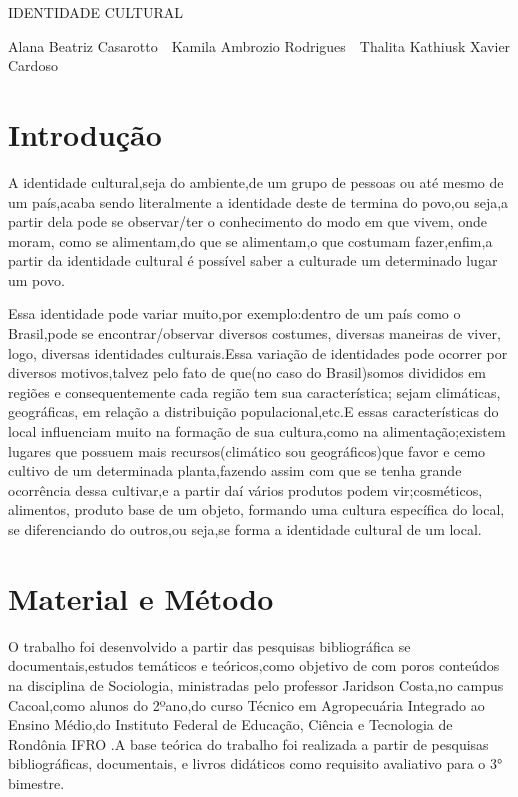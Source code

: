 \documentclass[article,12pt,onesidea,4paper,english,brazil]{abntex2}
\begin{document}
	
	
	\frenchspacing 
	
	\begin{center}
		\LARGE IDENTIDADE CULTURAL
		
		\normalsize
		Alana Beatriz Casarotto \,\,
	Kamila Ambrozio Rodrigues \,\,
		Thalita Kathiusk Xavier Cardoso 
	
	\end{center}
	


	
	\section*{Introdução}
	

A identidade cultural,seja do ambiente,de um grupo de pessoas ou até mesmo de um país,acaba sendo literalmente a identidade deste de termina do povo,ou seja,a partir dela pode se observar/ter o conhecimento do modo em que vivem, onde moram, como se alimentam,do que se alimentam,o que costumam fazer,enfim,a partir da identidade cultural é possível saber a culturade um determinado lugar um povo.

Essa identidade pode variar muito,por exemplo:dentro de um país como o Brasil,pode se encontrar/observar diversos costumes, diversas maneiras de viver, logo, diversas identidades culturais.Essa variação de identidades pode ocorrer por diversos motivos,talvez pelo fato de que(no caso do Brasil)somos divididos em regiões e consequentemente cada região tem sua característica; sejam climáticas, geográficas, em relação a distribuição populacional,etc.E essas características do local influenciam muito na formação de sua cultura,como na alimentação;existem lugares que possuem mais recursos(climático sou geográficos)que favor e cemo cultivo de um determinada planta,fazendo assim com que se tenha grande ocorrência dessa cultivar,e a partir daí vários produtos podem vir;cosméticos, alimentos, produto base de um objeto, formando uma cultura específica do local, se diferenciando do outros,ou seja,se forma a identidade cultural de um local.
	
	\section*{Material e Método}
	
O trabalho foi desenvolvido a partir das pesquisas bibliográfica se documentais,estudos temáticos e teóricos,como objetivo de com poros conteúdos na disciplina de Sociologia, ministradas pelo professor Jaridson Costa,no campus Cacoal,como alunos do 2ºano,do curso Técnico em Agropecuária Integrado ao Ensino Médio,do Instituto Federal de Educação, Ciência e Tecnologia de Rondônia IFRO .A base teórica do trabalho foi realizada a partir de pesquisas bibliográficas, documentais, e livros didáticos como requisito avaliativo para o 3° bimestre.
	
\end{document}
